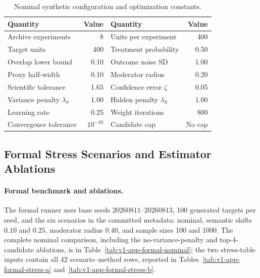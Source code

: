 \documentclass[11pt]{article}
\numberwithin{equation}{section}
\newcommand{\1}{\mathbf 1}
\begin{document}
\begin{table}[H]
\centering
\caption{Nominal synthetic configuration and optimization constants.}
\label{tab:v1-app-config}
\begin{tabular}{lr@{\qquad}lr}
\toprule
Quantity & Value & Quantity & Value \\
\midrule
Archive experiments & 8 & Units per experiment & 400 \\
Target units & 400 & Treatment probability & 0.50 \\
Overlap lower bound & 0.10 & Outcome noise SD & 1.00 \\
Proxy half-width & 0.10 & Moderator radius & 0.20 \\
Scientific tolerance & 1.65 & Confidence error $\zeta$ & 0.05 \\
Variance penalty $\lambda_\sigma$ & 1.00 & Hidden penalty $\lambda_h$ & 1.00 \\
Learning rate & 0.25 & Weight iterations & 800 \\
Convergence tolerance & $10^{-10}$ & Candidate cap & No cap \\
\bottomrule
\end{tabular}
\end{table}


\subsection{Formal Stress Scenarios and Estimator Ablations}
\label{app:formal-ablations}
\suppressfloats[t]

\paragraph{Formal benchmark and ablations.}
The formal runner uses base seeds $20260811$--$20260813$, 100 generated targets per seed, and the six scenarios in the committed metadata: nominal, semantic shifts $0.10$ and $0.25$, moderator radius $0.40$, and sample sizes 100 and 1000.  The complete nominal comparison, including the no-variance-penalty and top-4-candidate ablations, is in Table~\ref{tab:v1-app-formal-nominal}; the two stress-table inputs contain all 42 scenario--method rows, reported in Tables~\ref{tab:v1-app-formal-stress-a} and~\ref{tab:v1-app-formal-stress-b}.




\end{document}
